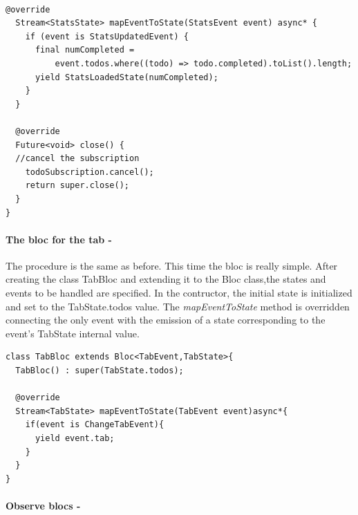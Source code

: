   \begin{code}
\mbox{}\\
 \mbox{}
\label{code:2.14}
\begin{verbatim}
@override
  Stream<StatsState> mapEventToState(StatsEvent event) async* {
    if (event is StatsUpdatedEvent) {
      final numCompleted =
          event.todos.where((todo) => todo.completed).toList().length;
      yield StatsLoadedState(numCompleted);
    }
  }

  @override
  Future<void> close() {
  //cancel the subscription
    todoSubscription.cancel();
    return super.close();
  }
}
\end{verbatim}
\mbox{}
\end{code}


\paragraph{The bloc for the tab - }
\label{subpar:todo_app_bloc_core_state}

The procedure is the same as before. This time the bloc is really simple.  After creating the class TabBloc and extending it to the Bloc class,the states and events to be handled are specified.  In the contructor, the initial state is initialized and set to the TabState.todos value. The \textit{mapEventToState} method is overridden connecting the only event with the emission of a state corresponding to the event's TabState internal value.

\begin{code}
\mbox{}
 \mbox{}
\label{code:2.14}
\begin{verbatim}
class TabBloc extends Bloc<TabEvent,TabState>{
  TabBloc() : super(TabState.todos);

  @override
  Stream<TabState> mapEventToState(TabEvent event)async*{
    if(event is ChangeTabEvent){
      yield event.tab;
    }
  }
}
\end{verbatim}
\mbox{}
\end{code}
\paragraph{Observe blocs - }
\label{subpar:todo_app_bloc_core_state}

